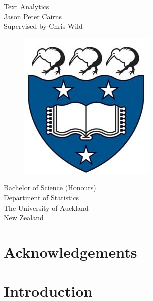 \documentclass[11pt, a4paper, oneside]{report}
\begin{document}
\begin{titlepage}
  \centering
  \vspace*{2.5cm}
  {\Huge Text Analytics}\\
  \vspace{1.5cm}
  {\Large Jason Peter Cairns}\\
  \vspace{1.5cm}
  Supervised by Chris Wild\\
  \vspace{1.5cm}
  \begin{figure}[H]
    \centering
    \includegraphics[scale=0.4]{img/logo.jpg}
  \end{figure}
  \vspace{1cm}
  Bachelor of Science (Honours)\\
  Department of Statistics\\
  The University of Auckland\\
  New Zealand
\end{titlepage}

\listoftodos



\chapter*{Acknowledgements}
\label{cha:acknowledgements}

\tableofcontents
{}
\renewcommand\listoflistingscaption{List of source codes}
\listoflistings
{}
\listoftables
{}
\listoffigures

\chapter{Introduction}
\label{cha:introduction}
\end{document}

